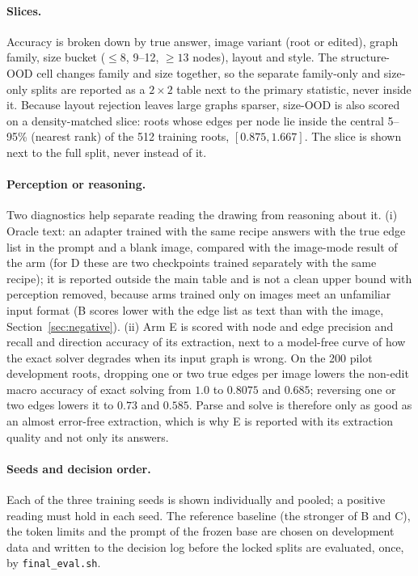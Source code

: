 \paragraph{Slices.}
Accuracy is broken down by true answer, image variant (root or edited), graph family, size
bucket ($\le 8$, 9--12, $\ge 13$ nodes), layout and style. The structure-OOD cell changes
family and size together, so the separate family-only and size-only splits are reported as a
$2\times2$ table next to the primary statistic, never inside it. Because layout rejection
leaves large graphs sparser, size-OOD is also scored on a density-matched slice: roots whose
edges per node lie inside the central 5--95\% (nearest rank) of the 512 training roots,
$[0.875, 1.667]$. The slice is shown next to the full split, never instead of it.

\paragraph{Perception or reasoning.}
Two diagnostics help separate reading the drawing from reasoning about it. (i) Oracle text: an
adapter trained with the same recipe answers with the true edge list in the prompt and a blank
image, compared with the image-mode result of the arm (for D these are two checkpoints trained
separately with the same recipe); it is reported outside the main table and is not a clean upper bound with perception
removed, because arms trained only on images meet an unfamiliar input format (B scores lower
with the edge list as text than with the image, Section~\ref{sec:negative}). (ii) Arm E is scored with node and edge precision and recall and
direction accuracy of its extraction, next to a model-free curve of how the exact solver
degrades when its input graph is wrong. On the 200 pilot development roots, dropping one or
two true edges per image lowers the non-edit macro accuracy of exact solving from $1.0$ to
$0.8075$ and $0.685$; reversing one or two edges lowers it to $0.73$ and $0.585$. Parse and
solve is therefore only as good as an almost error-free extraction, which is why E is reported
with its extraction quality and not only its answers.

\paragraph{Seeds and decision order.}
Each of the three training seeds is shown individually and pooled; a positive reading must
hold in each seed. The reference baseline (the stronger of B and C), the token limits and the
prompt of the frozen base are chosen on development data and written to the decision log
before the locked splits are evaluated, once, by \texttt{final\_eval.sh}.

